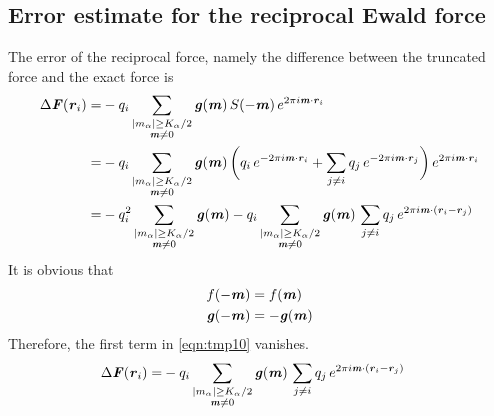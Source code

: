 \documentclass[aps,pre,preprint]{revtex4}
\renewcommand{\v}[1]{\textbf{\textit{#1}}}
\begin{document}
\subsection{Error estimate for the reciprocal Ewald force}
The error of the reciprocal force, namely the difference between the
truncated force and the exact force is
\begin{align}\nonumber
  \Delta \v F(\v r_i)
  = & - 
  q_i 
  \sum_{
    \begin{subarray}{c}
      \vert m_\alpha\vert \geq K_\alpha/2\\
      \v m\neq 0
    \end{subarray}}
  \v g(\v m) \,
  S(-\v m)\,
  e^{2\pi i\v m\cdot\v r_i}  \\ \nonumber
  = & - q_i 
  \sum_{
    \begin{subarray}{c}
      \vert m_\alpha\vert \geq K_\alpha/2\\
      \v m\neq 0
    \end{subarray}}
  \v g(\v m) \,
  \bigg(
  q_i\,e^{-2\pi i\v m\cdot\v r_i} +
  \sum_{j\neq i}q_j\,e^{-2\pi i\v m\cdot\v r_j}
  \bigg)\,
  e^{2\pi i\v m\cdot\v r_i}  \\ \label{eqn:tmp10}
  = & - q_i^2
  \sum_{
    \begin{subarray}{c}
      \vert m_\alpha\vert \geq K_\alpha/2\\
      \v m\neq 0
    \end{subarray}}
  \v g(\v m) -
  q_i\sum_{
    \begin{subarray}{c}
      \vert m_\alpha\vert \geq K_\alpha/2\\
      \v m\neq 0
    \end{subarray}}
  \v g(\v m) \,
  \sum_{j\neq i}q_j\,e^{2\pi i\v m\cdot(\v r_i - \v r_j)}
\end{align}
It is obvious that
\begin{align}
  f(-\v m) &= f(\v m) \\
  \v g(-\v m) &= -\v g(\v m)
\end{align}
Therefore, the first term in \eqref{eqn:tmp10} vanishes. 
\begin{align} \label{eqn:tmp13}
  \Delta \v F(\v r_i)
  = & - 
  q_i\sum_{
    \begin{subarray}{c}
      \vert m_\alpha\vert \geq K_\alpha/2\\
      \v m\neq 0
    \end{subarray}}
  \v g(\v m) \,
  \sum_{j\neq i}q_j\,e^{2\pi i\v m\cdot(\v r_i - \v r_j)}  
\end{align}
\end{document}

